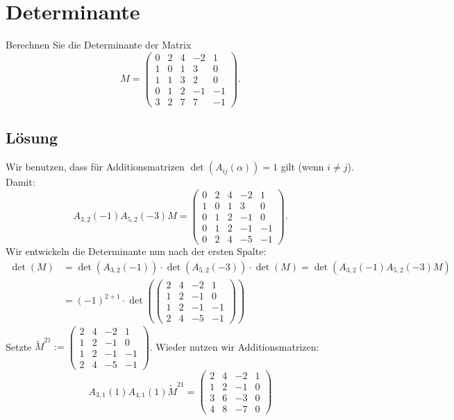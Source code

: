 \newpage
\section{Determinante}

Berechnen Sie die Determinante der Matrix
$$
	M=\begin{pmatrix}
		0	& 2	& 4	& -2 & 1	\\
		1	& 0	& 1	& 3	& 0	\\
		1	& 1	& 3	& 2	& 0\\
		0	& 1	& 2	& -1	& -1	\\
		3	& 2	& 7	& 7	& -1	
	\end{pmatrix}.
$$
\subsection*{L\"osung}
Wir benutzen, dass für Additionsmatrizen $\det(A_{ij}(\alpha))=1$ gilt (wenn $i\ne j$).
Damit:
$$
	A_{3,2}(-1)A_{5,2}(-3)M=\begin{pmatrix}
		0	& 2	& 4	& -2 & 1	\\
		1	& 0	& 1	& 3	& 0	\\
		0	& 1	& 2	& -1	& 0\\
		0	& 1	& 2	& -1	& -1	\\
		0	& 2	& 4	& -5	& -1	
	\end{pmatrix}.
$$
Wir entwickeln die Determinante nun nach der ersten Spalte:
\begin{align*}
\det(M)&=\det(A_{3,2}(-1))\cdot\det(A_{5,2}(-3))\cdot\det(M)=\det(A_{3,2}(-1)A_{5,2}(-3)M)\\
&=(-1)^{2+1}\cdot \det(\begin{pmatrix}
			 2	& 4	& -2 & 1	\\
			 1	& 2	& -1	& 0\\
			 1	& 2	& -1	& -1	\\
			 2	& 4	& -5	& -1	
	\end{pmatrix})
\end{align*}
Setzte $\tilde M^{21}:=\begin{pmatrix}
			 2	& 4	& -2 & 1	\\
			 1	& 2	& -1	& 0\\
			 1	& 2	& -1	& -1	\\
			 2	& 4	& -5	& -1	
	\end{pmatrix}$.
Wieder nutzen wir Additionsmatrizen:
$$
A_{3,1}(1)A_{4,1}(1)\tilde M^{21}=\begin{pmatrix}
			 2	& 4	& -2 & 1	\\
			 1	& 2	& -1	& 0\\
			 3	& 6	& -3& 0	\\
			 4	& 8	& -7	& 0	
	\end{pmatrix}
$$
